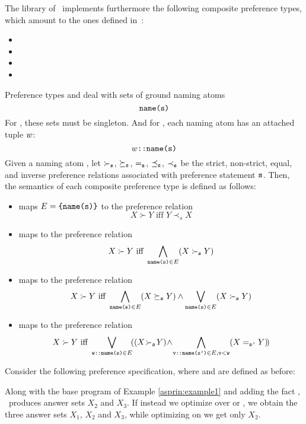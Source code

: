 The library of \asprin\ implements furthermore the following composite preference types,
which amount to the ones defined in~\cite{sonpon06a}: 
\begin{itemize}
\item {}
\item {}
\item {}
\item {}
\end{itemize}
Preference types  and  deal with sets of ground naming atoms
\[\texttt{name(s)}\]
For , these sets must be singleton.
And for , each naming atom has an attached tuple $\texttt{$w$}$: 
\[w\texttt{::name(s)}\]
Given a naming atom , 
let $\succ_{\texttt{s}}$, $\succeq_{\texttt{s}}$, $=_{\texttt{s}}$, $\preceq_{\texttt{s}}$, $\prec_{\texttt{s}}$ be the 
strict, non-strict, equal, and inverse preference relations associated with preference statement $\texttt{s}$.
Then, the semantics of each composite preference type is defined as follows:
\begin{itemize}
\item
{} maps $E=\texttt{\{name(s)\}}$ to the preference relation
\[
X \succ Y \text{ iff } Y \prec_s X
\]
\item 
{} maps  to the preference relation 
\[
X \succ Y \text{ iff } \bigwedge_{\texttt{name(s)}\in E}(X\succ_{\texttt{s}} Y)
\]
\item 
{} maps  to the preference relation 
\[
X \succ Y \text{ iff } \bigwedge_{\texttt{name(s)}\in E} (X\succeq_{\texttt{s}} Y)\wedge\bigvee_{\texttt{name(s)}\in E} (X\succ_{\texttt{s}} Y)
\]
\item
{} maps  to the preference relation 
\[
X \succ Y \text{ iff } \bigvee_{\texttt{w::name(s)}\in E}\!((X\!\succ_{\texttt{s}} \!Y)\!\wedge\!\bigwedge_{\texttt{v::name(s')}\in E,\texttt{v}<\texttt{w}}(X =_{\texttt{s'}} Y)\!)
\] 
\end{itemize}

\begin{example}\label{asprin:composite}
Consider the following preference specification, where  and  are defined as before:
%

%
Along with the base program of Example \ref{asprin:example1} and adding the fact , 
\asprin\ produces answer sets $X_2$ and $X_3$. 
If instead we optimize over \code{p7} or \code{p8}, we obtain the three answer sets $X_1$, $X_2$ and $X_3$, 
while optimizing on \code{p9} we get only $X_2$.
\end{example}

